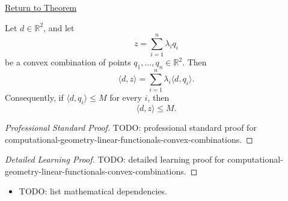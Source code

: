 \newpage
{}
\label{prf:computational-geometry-linear-functionals-convex-combinations}

\begin{remark*}[Return]
\hyperref[lem:computational-geometry-linear-functionals-convex-combinations]{Return to Theorem}

\end{remark*}

\begin{lemma*}
Let \(d\in\mathbb{R}^2\), and let
\[
  z=\sum_{i=1}^{n}\lambda_i q_i
\]
be a convex combination of points \(q_1,\dots,q_n\in\mathbb{R}^2\). Then
\[
  \langle d,z\rangle
  =
  \sum_{i=1}^{n}\lambda_i\langle d,q_i\rangle.
\]
Consequently, if \(\langle d,q_i\rangle\le M\) for every \(i\), then
\[
  \langle d,z\rangle\le M.
\]
\end{lemma*}

\begin{proof}[Professional Standard Proof]
\LRAProofBodyStart
TODO: professional standard proof for computational-geometry-linear-functionals-convex-combinations.
\end{proof}

\begin{proof}[Detailed Learning Proof]
\LRAProofBodyStart
TODO: detailed learning proof for computational-geometry-linear-functionals-convex-combinations.
\end{proof}

\begin{remark*}
\end{remark*}

\begin{dependencies}
\begin{itemize}
  \item TODO: list mathematical dependencies.
\end{itemize}
\end{dependencies}

\clearpage
